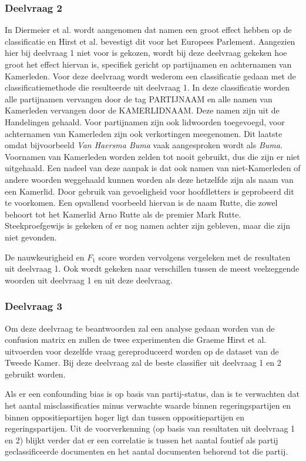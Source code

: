 \subsubsection{Deelvraag 2}
In Diermeier et al. \cite{diermeier_godbout_yu_kaufmann_2012} wordt aangenomen dat namen een groot effect hebben op de classificatie en Hirst et al. \cite{Hirst_textto} bevestigt dit voor het Europees Parlement. Aangezien hier bij deelvraag 1 niet voor is gekozen, wordt bij deze deelvraag gekeken hoe groot het effect hiervan is, specifiek gericht op partijnamen en achternamen van Kamerleden. Voor deze deelvraag wordt wederom een classificatie gedaan met de classificatiemethode die resulteerde uit deelvraag 1. In deze classificatie worden alle partijnamen vervangen door de tag PARTIJNAAM en alle namen van Kamerleden vervangen door de KAMERLIDNAAM. Deze namen zijn uit de Handelingen gehaald. Voor partijnamen zijn ook lidwoorden toegevoegd, voor achternamen van Kamerleden zijn ook verkortingen meegenomen. Dit laatste omdat bijvoorbeeld \textit{Van Haersma Buma} vaak aangesproken wordt als \textit{Buma}. Voornamen van Kamerleden worden zelden tot nooit gebruikt, dus die zijn er niet uitgehaald. Een nadeel van deze aanpak is dat ook namen van niet-Kamerleden of andere woorden weggehaald kunnen worden als deze hetzelfde zijn als naam van een Kamerlid. Door gebruik van gevoeligheid voor hoofdletters is geprobeerd dit te voorkomen. Een opvallend voorbeeld hiervan is de naam Rutte, die zowel behoort tot het Kamerlid Arno Rutte als de premier Mark Rutte. Steekproefgewijs is gekeken of er nog namen achter zijn gebleven, maar die zijn niet gevonden. \par
De nauwkeurigheid en $F_1$ score worden vervolgens vergeleken met de resultaten uit deelvraag 1. Ook wordt gekeken naar verschillen tussen de meest veelzeggende woorden uit deelvraag 1 en uit deze deelvraag.

\subsubsection{Deelvraag 3}

Om deze deelvraag te beantwoorden zal een analyse gedaan worden van de confusion matrix en zullen de twee experimenten die Graeme Hirst et al. uitvoerden voor dezelfde vraag gereproduceerd worden op de dataset van de Tweede Kamer. Bij deze deelvraag zal de beste classifier uit deelvraag 1 en 2 gebruikt worden.\par
Als er een confounding bias is op basis van partij-status, dan is te verwachten dat het aantal misclassificaties minus verwachte waarde binnen regeringspartijen en binnen oppositiepartijen hoger ligt dan tussen oppositiepartijen en regeringspartijen. Uit de voorverkenning (op basis van resultaten uit deelvraag 1 en 2) blijkt verder dat er een correlatie is tussen het aantal foutief als partij geclassificeerde documenten en het aantal documenten behorend tot die partij. 

